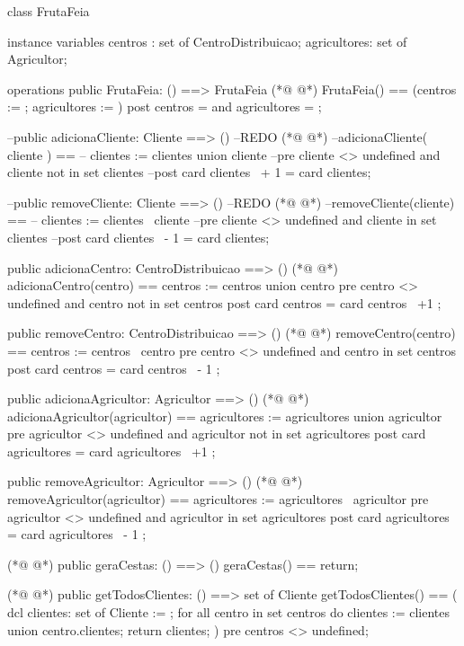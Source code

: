 \begin{vdmpp}[breaklines=true]
class FrutaFeia

instance variables
 centros : set of CentroDistribuicao;
 agricultores: set of Agricultor;
 
operations 
 public FrutaFeia: () ==> FrutaFeia
(*@
\label{FrutaFeia:9}
@*)
 FrutaFeia() == (centros := {}; agricultores := {})
 post centros = {} and agricultores = {};

 --public adicionaCliente: Cliente ==> () --REDO
(*@
\label{adicionaCliente:13}
@*)
 --adicionaCliente( cliente ) == 
 --  clientes := clientes union {cliente}
 --pre cliente <> undefined and cliente not in set clientes
 --post card clientes~ + 1 = card clientes;  
 
 --public removeCliente: Cliente ==> ()  --REDO
(*@
\label{removeCliente:19}
@*)
 --removeCliente(cliente) == 
 --  clientes := clientes \ {cliente}
 --pre cliente <> undefined and cliente in set clientes
 --post card clientes~ - 1 = card clientes; 
 
 public adicionaCentro: CentroDistribuicao  ==> ()
(*@
\label{adicionaCentro:25}
@*)
 adicionaCentro(centro) ==
   centros := centros union {centro}
 pre centro <> undefined and centro not in set centros
 post card centros = card centros~ +1 ;
 
 public removeCentro: CentroDistribuicao  ==> ()
(*@
\label{removeCentro:31}
@*)
 removeCentro(centro) ==
   centros := centros \ {centro}
 pre centro <> undefined and centro in set centros
 post card centros = card centros~ - 1 ;
 
 public adicionaAgricultor: Agricultor ==> ()
(*@
\label{adicionaAgricultor:37}
@*)
 adicionaAgricultor(agricultor) ==
   agricultores := agricultores union {agricultor}
 pre agricultor <> undefined and agricultor not in set agricultores
 post card agricultores = card agricultores~ +1 ;
 
 public removeAgricultor: Agricultor  ==> ()
(*@
\label{removeAgricultor:43}
@*)
 removeAgricultor(agricultor) ==
   agricultores := agricultores \ {agricultor}
 pre agricultor <> undefined and agricultor in set agricultores
 post card agricultores = card agricultores~ - 1 ;


(*@
\label{geraCestas:49}
@*)
 public geraCestas: () ==> () 
 geraCestas() ==
 return;
  
(*@
\label{getTodosClientes:53}
@*)
 public getTodosClientes: () ==> set of Cliente
 getTodosClientes() == 
 (
  dcl  clientes: set of Cliente := {};
  for all centro in set centros 
   do 
    clientes := clientes union centro.clientes;
  return clientes;
 )
 pre centros <> undefined;
 

\end{vdmpp}
